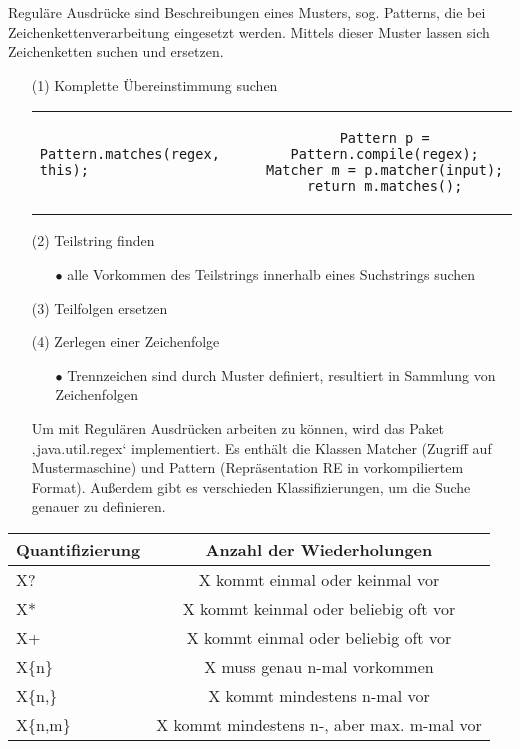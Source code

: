 Reguläre Ausdrücke sind Beschreibungen eines Musters, sog. Patterns, die bei Zeichenkettenverarbeitung eingesetzt werden. Mittels dieser Muster lassen sich Zeichenketten suchen und ersetzen.\\
\begin{itemize}
\item[(1)] Komplette Übereinstimmung suchen \\
\begin{tabular}{l c}
\begin{lstlisting}
Pattern.matches(regex, this);
\end{lstlisting} & \begin{lstlisting}
Pattern p = Pattern.compile(regex);
Matcher m = p.matcher(input);
return m.matches();
\end{lstlisting} \\
\end{tabular}
\item[(2)] Teilstring finden
\begin{itemize}
\item[$\bullet$] alle Vorkommen des Teilstrings innerhalb eines Suchstrings suchen
\end{itemize}
\item[(3)] Teilfolgen ersetzen
\item[(4)] Zerlegen einer Zeichenfolge
\begin{itemize}
\item[$\bullet$] Trennzeichen sind durch Muster definiert, resultiert in Sammlung von Zeichenfolgen
\end{itemize}
\end{itemize}
\nsecend
{}
\begin{itemize}
\item[]Um mit Regulären Ausdrücken arbeiten zu können, wird das Paket ‚java.util.regex‘ implementiert. Es enthält die Klassen Matcher (Zugriff auf Mustermaschine) und Pattern (Repräsentation RE in vorkompiliertem Format).
Außerdem gibt es verschieden Klassifizierungen, um die Suche genauer zu definieren.
\end{itemize}
\begin{table} [H]
\centering
\begin{tabular}{l|c}
\multicolumn{1}{l}{\textbf{Quantifizierung}} & \textbf{Anzahl der Wiederholungen}\\
\hline
X? & X kommt einmal oder keinmal vor \\
\hline
X* & X kommt keinmal oder beliebig oft vor \\
\hline
X+ & X kommt einmal oder beliebig oft vor \\
\hline
X\{n\} & X muss genau n-mal vorkommen \\
\hline
X\{n,\} & X kommt mindestens n-mal vor \\
\hline
X\{n,m\} & X kommt mindestens n-, aber max. m-mal vor \\
\hline
\end{tabular}
\end{table}
